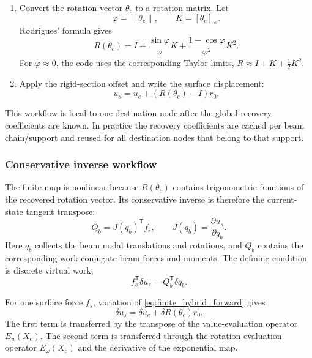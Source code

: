 \documentclass[11pt,a4paper]{article}
\newcommand{\T}{\mathsf{T}}
\begin{document}
\begin{enumerate}
\[        \theta_c=\frac12 E_\omega(X_c)
        \begin{bmatrix}a\\c\end{bmatrix},
      \]
      where \(E_u\) evaluates the value of the interpolant and
      \(E_\omega\) evaluates its curl.
\item Convert the rotation vector \(\theta_c\) to a rotation matrix.  Let
      \[
        \varphi=\|\theta_c\|,
        \qquad
        K=[\theta_c]_\times .
      \]
      Rodrigues' formula gives
      \begin{equation}
        R(\theta_c)
        =
        I
        +\frac{\sin\varphi}{\varphi}K
        +\frac{1-\cos\varphi}{\varphi^2}K^2 .
        \label{eq:finite_hybrid_rodrigues}
      \end{equation}
      For \(\varphi\approx0\), the code uses the corresponding Taylor
      limits, \(R\approx I+K+\frac12K^2\).
\item Apply the rigid-section offset and write the surface displacement:
      \[
        u_s=u_c+\left(R(\theta_c)-I\right)r_0 .
      \]
\end{enumerate}

This workflow is local to one destination node after the global recovery
coefficients are known.  In practice the recovery coefficients are cached per
beam chain/support and reused for all destination nodes that belong to that
support.

\subsubsection{Conservative inverse workflow}

The finite map is nonlinear because \(R(\theta_c)\) contains trigonometric
functions of the recovered rotation vector.  Its conservative inverse is
therefore the current-state tangent transpose:
\begin{equation}
  Q_b=J(q_b)^\T f_s,
  \qquad
  J(q_b)=\frac{\partial u_s}{\partial q_b}.
  \label{eq:finite_hybrid_tangent_transpose}
\end{equation}
Here \(q_b\) collects the beam nodal translations and rotations, and
\(Q_b\) contains the corresponding work-conjugate beam forces and moments.
The defining condition is discrete virtual work,
\[
  f_s^\T\delta u_s = Q_b^\T\delta q_b .
\]

For one surface force \(f_s\), variation of
\eqref{eq:finite_hybrid_forward} gives
\begin{equation}
  \delta u_s
  =
  \delta u_c
  +
  \delta R(\theta_c) r_0 .
  \label{eq:finite_hybrid_variation}
\end{equation}
The first term is transferred by the transpose of the value-evaluation
operator \(E_u(X_c)\).  The second term is transferred through the rotation
evaluation operator \(E_\omega(X_c)\) and the derivative of the exponential
map.
\end{document}
